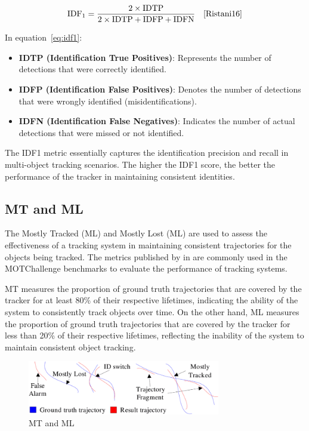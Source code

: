 \begin{equation}
    \label{eq:idf1}
    \text{IDF}_1 = \frac{2 \times \text{IDTP}}{2 \times \text{IDTP} + \text{IDFP} + \text{IDFN}}
    \quad\text{\cite[Eq.~11]{Ristani16}}
\end{equation}

In equation~\ref{eq:idf1}:

\begin{itemize}
    \item \textbf{IDTP (Identification True Positives)}: Represents the number of detections that were correctly identified.
    \item \textbf{IDFP (Identification False Positives)}: Denotes the number of detections that were wrongly identified (misidentifications).
    \item \textbf{IDFN (Identification False Negatives)}: Indicates the number of actual detections that were missed or not identified.
\end{itemize}

The IDF1 metric essentially captures the identification precision and recall in multi-object tracking scenarios. The higher the IDF1 score, the better the performance of the tracker in maintaining consistent identities.

\subsection{MT and ML}\label{subsec:mt_ml}
The Mostly Tracked (ML) and Mostly Lost (ML) are used to assess the effectiveness of a tracking system in maintaining consistent trajectories for the objects being tracked. The metrics published by \textcite{Wu06} in \citeyear{Wu06} are commonly used in the MOTChallenge benchmarks to evaluate the performance of tracking systems.

MT measures the proportion of ground truth trajectories that are covered by the tracker for at least 80\% of their respective lifetimes, indicating the ability of the system to consistently track objects over time. On the other hand, ML measures the proportion of ground truth trajectories that are covered by the tracker for less than 20\% of their respective lifetimes, reflecting the inability of the system to maintain consistent object tracking.

\begin{figure}[ht]
    \centering
    \includegraphics[width=0.75\textwidth]{resources/fig/Wu06-MT_ML.png}
    \caption{MT and ML~\cite[Fig.~5]{Wu06}}\label{fig:mt_ml}
\end{figure}

